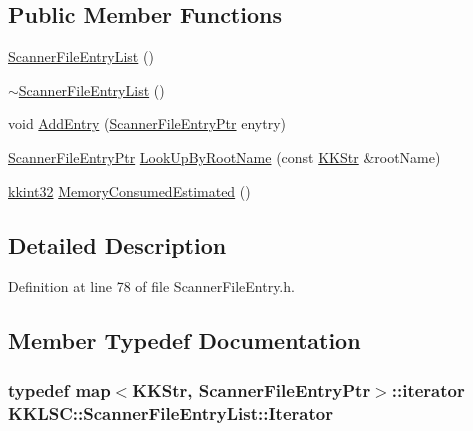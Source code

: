 \subsection*{Public Member Functions}
\begin{DoxyCompactItemize}
\item 
\hyperlink{class_k_k_l_s_c_1_1_scanner_file_entry_list_aa23b829749efa89e9b060971f7744b50}{Scanner\+File\+Entry\+List} ()
\item 
\hyperlink{class_k_k_l_s_c_1_1_scanner_file_entry_list_af24bfb9a2ab8928e3fe9386293a2bcb8}{$\sim$\+Scanner\+File\+Entry\+List} ()
\item 
void \hyperlink{class_k_k_l_s_c_1_1_scanner_file_entry_list_a74ba98ac8d6c6d7d8479af46f6c8cb9c}{Add\+Entry} (\hyperlink{namespace_k_k_l_s_c_a54ff7eab3cb7195f02302b70282bfa8d}{Scanner\+File\+Entry\+Ptr} enytry)
\item 
\hyperlink{namespace_k_k_l_s_c_a54ff7eab3cb7195f02302b70282bfa8d}{Scanner\+File\+Entry\+Ptr} \hyperlink{class_k_k_l_s_c_1_1_scanner_file_entry_list_ab10ca380be8b53029b09f49e70e12d78}{Look\+Up\+By\+Root\+Name} (const \hyperlink{class_k_k_b_1_1_k_k_str}{K\+K\+Str} \&root\+Name)
\item 
\hyperlink{namespace_k_k_b_a8fa4952cc84fda1de4bec1fbdd8d5b1b}{kkint32} \hyperlink{class_k_k_l_s_c_1_1_scanner_file_entry_list_a499d6a8b16abc44d72a95cb52f67e571}{Memory\+Consumed\+Estimated} ()
\end{DoxyCompactItemize}


\subsection{Detailed Description}


Definition at line 78 of file Scanner\+File\+Entry.\+h.



\subsection{Member Typedef Documentation}
\subsubsection[{\texorpdfstring{Iterator}{Iterator}}]{\setlength{\rightskip}{0pt plus 5cm}typedef map$<${\bf K\+K\+Str}, {\bf Scanner\+File\+Entry\+Ptr}$>$\+::iterator {\bf K\+K\+L\+S\+C\+::\+Scanner\+File\+Entry\+List\+::\+Iterator}}\hypertarget{class_k_k_l_s_c_1_1_scanner_file_entry_list_afd6da779c73c629802802105410c5bcc}{}\label{class_k_k_l_s_c_1_1_scanner_file_entry_list_afd6da779c73c629802802105410c5bcc}



